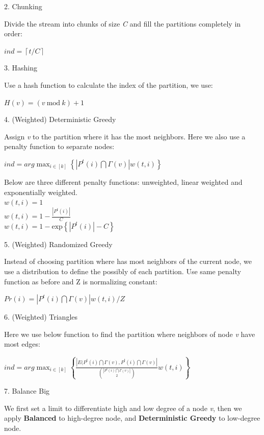 \documentclass[12pt]{article}
\begin{document}
2. Chunking

Divide the stream into chunks of size \emph{C} and fill the partitions completely in order:
\begin {center}
$ind = \left \lceil t/C \right \rceil$
\end{center}

3. Hashing

Use a hash function to calculate the index of the partition, we use:
\begin{center}
$H(v)=(v\ \text{mod}\ k)+1$
\end{center}

4. (Weighted) Deterministic Greedy

Assign \emph{v} to the partition where it has the most neighbors. Here we also use a penalty function to separate nodes:
\begin{center}
$ind = arg \max_{i\in \left [ k \right ]}\left \{ \left | P^{t}(i)\bigcap \Gamma (v) \right |w(t,i) \right \}$
\end{center}
Below are three different penalty functions: unweighted, linear weighted and exponentially weighted.
\\
$w(t,i)=1$\\
$w(t,i)=1-\frac{\left | P^{t}(i) \right |}{C}$\\
$w(t,i)=1-\text{exp}\left \{ \left | P^{t}(i) \right |-C \right \}$

5. (Weighted) Randomized Greedy

Instead of choosing partition where has most neighbors of the current node, we use a distribution to define the possibly of each partition. Use same penalty function as before and Z is normalizing constant:
\begin{center}
$Pr(i) =  \left | P^{t}(i)\bigcap \Gamma (v) \right |w(t,i)/Z$
\end{center}

6. (Weighted) Triangles

Here we use below function to find the partition where neighbors of node \emph{v} have most edges:
\begin{center}
$ind = arg \max_{i\in \left [ k \right ]}\left \{ \frac{ \left | E(P^{t}(i)\bigcap \Gamma (v),P^{t}(i)\bigcap \Gamma (v) \right |}{\binom{\left | P^{t}(i)\bigcap \Gamma (v) \right |}{2}}w(t,i) \right \}$
\end {center}

7. Balance Big

We first set a limit to differentiate high and low degree of a node \emph{v}, then we apply \textbf{Balanced} to high-degree node, and \textbf{Deterministic Greedy} to low-degree node.
\end{document}
